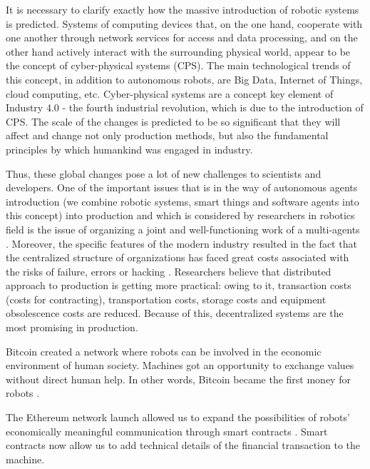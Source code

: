 \documentclass{article}
\begin{document}
It is necessary to clarify exactly how the massive introduction of robotic systems is predicted. Systems of computing devices that, on the one hand, cooperate with one another through network services for access and data processing, and on the other hand actively interact with the surrounding physical world, appear to be the concept of cyber-physical systems (CPS)\cite{Kang2016SmartDirections}. The main technological trends of this concept, in addition to autonomous robots, are Big Data, Internet of Things, cloud computing, etc. Cyber-physical systems are a concept key element of Industry 4.0 \cite{Jazdi2014Cyber4.0} - the fourth industrial revolution, which is due to the introduction of CPS. The scale of the changes is predicted to be so significant that they will affect and change \cite{MonostoriLaszlo2014Cyber-physicalChallenges} not only production methods, but also the fundamental principles by which humankind was engaged in industry.

Thus, these global changes pose a lot of new challenges to scientists and developers. One of the important issues \cite{Leitao2015IndustrialIndustry} that is in the way of autonomous agents introduction (we combine robotic systems, smart things and software agents into this concept) into production and which is considered \cite{Zhu2014RobustSystems} by researchers in robotics field is the issue of organizing a joint and well-functioning work of a multi-agents \cite{Liu2013Multi-robotConstraints}. Moreover, the specific \cite{Lasi2014Industry4.0} features of the modern industry resulted in the fact that the centralized structure of organizations has faced great costs associated with the risks of failure, errors or hacking \cite{Khajavi2014AdditiveChain}. Researchers believe that distributed approach to production is getting more practical: owing to it, transaction costs (costs for contracting), transportation costs, storage costs and equipment obsolescence costs are reduced. Because of this, decentralized systems are the most promising in production\cite{DeGennaro2006DecentralizedSystems}.

Bitcoin created a network where robots can be involved in the economic environment of human society. Machines got an opportunity to exchange values without direct human help. In other words, Bitcoin became the first money for robots \cite{Kelion2015CouldThemselves}.

The Ethereum network launch allowed us to expand the possibilities of robots' economically meaningful communication through smart contracts \cite{Buterin2014EthereumPlatform}. Smart contracts now allow us to add technical details of the financial transaction to the machine.
\end{document}
